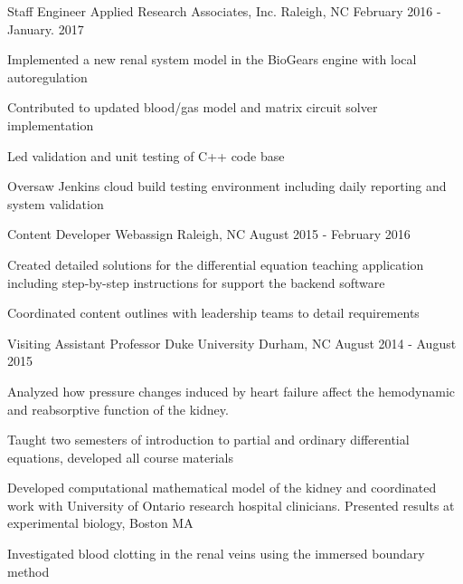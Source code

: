 \begin{cventries}
  \cventry
    {\color{awesome-red}Staff Engineer}%
    {Applied Research Associates, Inc.} %
    {Raleigh, NC} %
    {February 2016 - January. 2017} %
    {
      \begin{cvitems} %
        \item {Implemented a new renal system model in the BioGears engine with local autoregulation}
        \item {Contributed to updated blood/gas model and matrix circuit solver implementation}
        \item {Led validation and unit testing of C++ code base}
        \item {Oversaw Jenkins cloud build testing environment including daily reporting and system validation}
      \end{cvitems}
    }

  \cventry
    {\color{awesome-darknight}Content Developer} %
    {Webassign} %
    {Raleigh, NC} %
    {August 2015 - February 2016} %
    {
      \begin{cvitems} %
        \item {Created detailed solutions for the differential equation teaching application including step-by-step instructions for support the backend software}
        \item {Coordinated content outlines with leadership teams to detail requirements}
      \end{cvitems}
    }

  \cventry
    {Visiting Assistant Professor} %
    {Duke University} %
    {Durham, NC} %
    {August 2014 - August 2015} %
    {
      \begin{cvitems} %
        \item {Analyzed how pressure changes induced by heart failure affect the hemodynamic and reabsorptive
function of the kidney.}
		    \item {Taught two semesters of introduction to partial and ordinary differential equations, developed all course materials}
        \item {Developed computational mathematical model of the kidney and coordinated work with University of Ontario research hospital clinicians. Presented results at experimental biology, Boston MA}
        \item {Investigated blood clotting in the renal veins using the immersed boundary method}
      \end{cvitems}
    }


\end{cventries}
